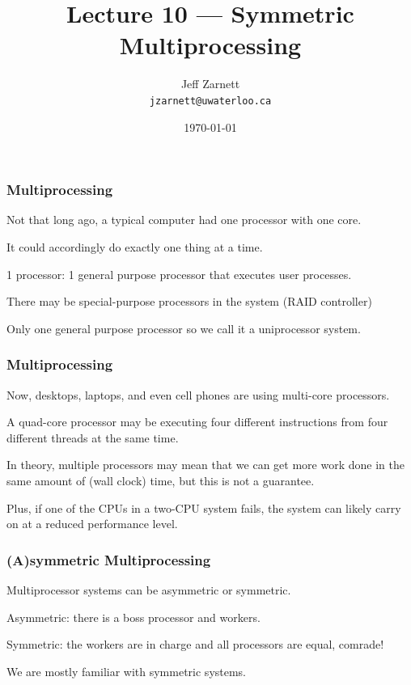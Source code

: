 

\title{Lecture 10 --- Symmetric Multiprocessing }

\author{Jeff Zarnett \\ \small \texttt{jzarnett@uwaterloo.ca}}
\date{\today}




\begin{frame}
  \titlepage

 \end{frame}

 
\begin{frame}
\frametitle{Multiprocessing}

Not that long ago, a typical computer had one processor with one core. 

It could accordingly do exactly one thing at a time. 

1 processor: 1 general purpose processor that executes user processes. 

There may be special-purpose processors in the system (RAID controller) 

Only one general purpose processor so we call it a uniprocessor system.



\end{frame}

 
\begin{frame}
\frametitle{Multiprocessing}

Now, desktops, laptops, and even cell phones are using multi-core processors.

A quad-core processor may be executing four different instructions from four different threads at the same time. 

In theory, multiple processors may mean that we can get more work done in the same amount of (wall clock) time, but this is not a guarantee. 

Plus, if one of the CPUs in a two-CPU system fails, the system can likely carry on at a reduced performance level.

\end{frame}

 
\begin{frame}
\frametitle{(A)symmetric Multiprocessing}

Multiprocessor systems can be \alert{asymmetric} or \alert{symmetric}.

Asymmetric: there is a \alert{boss} processor and \alert{workers}.

Symmetric: the workers are in charge and all processors are equal, comrade!

We are mostly familiar with symmetric systems.

\end{frame}

